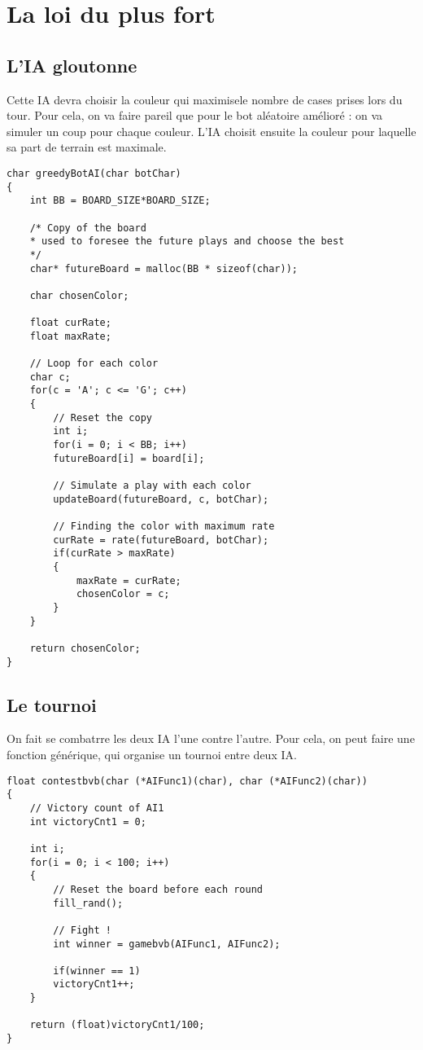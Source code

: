 \documentclass[a4paper,11pt]{article}
\begin{document}
	
	\section{La loi du plus fort}
	
	\subsection{L'IA gloutonne}
	
	Cette IA devra choisir la couleur qui maximisele nombre de cases prises lors du tour. Pour cela, on va faire pareil que pour le bot al\'eatoire am\'elior\'e : on va simuler un coup pour chaque couleur. L'IA choisit ensuite la couleur pour laquelle sa part de terrain est maximale.
	
	\begin{lstlisting}
char greedyBotAI(char botChar)
{	
	int BB = BOARD_SIZE*BOARD_SIZE;
	
	/* Copy of the board
	* used to foresee the future plays and choose the best
	*/
	char* futureBoard = malloc(BB * sizeof(char));
	
	char chosenColor;
	
	float curRate;
	float maxRate;
	
	// Loop for each color
	char c;
	for(c = 'A'; c <= 'G'; c++)
	{
		// Reset the copy
		int i;
		for(i = 0; i < BB; i++)
		futureBoard[i] = board[i];
		
		// Simulate a play with each color
		updateBoard(futureBoard, c, botChar);
		
		// Finding the color with maximum rate
		curRate = rate(futureBoard, botChar);
		if(curRate > maxRate)
		{
			maxRate = curRate;
			chosenColor = c;
		}
	}
	
	return chosenColor;
}\end{lstlisting}
	
	
	\subsection{Le tournoi}
	
	On fait se combatrre les deux IA l'une contre l'autre. Pour cela, on peut faire une fonction g\'en\'erique, qui organise un tournoi entre deux IA.
	
	\begin{lstlisting}
float contestbvb(char (*AIFunc1)(char), char (*AIFunc2)(char))
{
	// Victory count of AI1
	int victoryCnt1 = 0;
	
	int i;
	for(i = 0; i < 100; i++)
	{
		// Reset the board before each round
		fill_rand();
		
		// Fight !
		int winner = gamebvb(AIFunc1, AIFunc2);
		
		if(winner == 1)
		victoryCnt1++;
	}
	
	return (float)victoryCnt1/100;
}\end{lstlisting}
	
\end{document}
